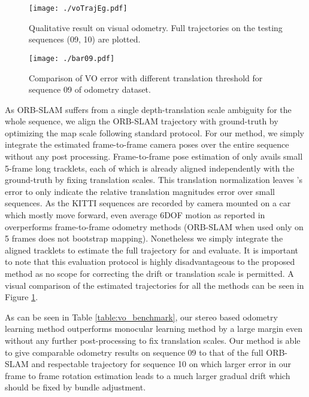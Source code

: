 \documentclass[10pt,twocolumn,letterpaper]{article}
\begin{document}
\begin{figure}[t] 
\centering
    \texttt{[image: ./voTrajEg.pdf]}
    \caption{Qualitative result on visual odometry. Full trajectories on the testing sequences (09, 10) are plotted. }\label{fig:voTrajEg}
\end{figure}

\begin{figure}[t] 
\centering
    \texttt{[image: ./bar09.pdf]}
    \caption{Comparison of VO error with different translation threshold for sequence 09 of odometry dataset.}
    \label{fig:voErrAnalysis09}
\end{figure}


As ORB-SLAM suffers from a single depth-translation scale ambiguity for the whole sequence, we align the ORB-SLAM trajectory with ground-truth by optimizing the map scale following standard protocol. 
For our method, we simply integrate the estimated frame-to-frame camera poses over the entire sequence without any post processing. 
Frame-to-frame pose estimation of \cite{zhou2017sfmlearner} only avails small 5-frame long tracklets, each of which is already aligned independently with the ground-truth by fixing translation scales. This translation normalization leaves \cite{zhou2017sfmlearner}'s error to only indicate the relative translation magnitudes error over small sequences. 
As the KITTI sequences are recorded by camera mounted on a car which mostly move forward, even average 6DOF motion as reported in \cite{zhou2017sfmlearner} overperforms frame-to-frame odometry methods (ORB-SLAM when used only on 5 frames does not bootstrap mapping). Nonetheless we simply integrate the aligned tracklets to estimate the full trajectory for \cite{zhou2017sfmlearner} and evaluate. 
It is important to note that this evaluation protocol is highly disadvantageous to the proposed method as no scope for correcting the drift or translation scale is permitted. A visual comparison of the estimated trajectories for all the methods can be seen in Figure \ref{fig:voTrajEg}.

As can be seen in Table \ref{table:vo_benchmark}, our stereo based odometry learning method outperforms monocular learning method \cite{zhou2017sfmlearner} by a large margin even without any further post-processing to fix translation scales. Our method is able to give comparable odometry results on sequence 09 to that of the full ORB-SLAM and respectable trajectory for sequence 10 on which larger error in our frame to frame rotation estimation leads to a much larger gradual drift which should be fixed by bundle adjustment. 
\end{document}
